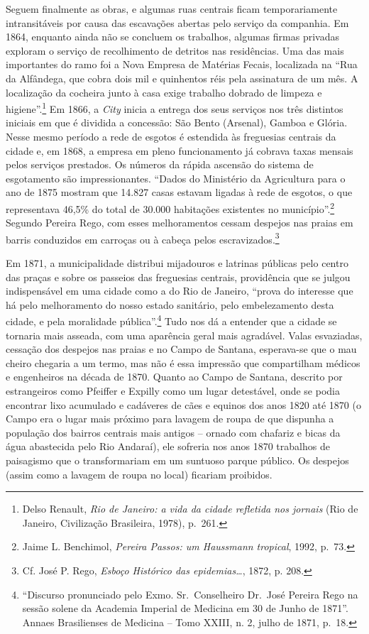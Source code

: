 Seguem finalmente as obras, e algumas ruas centrais ficam
temporariamente intransitáveis por causa das escavações abertas pelo
serviço da companhia. Em 1864, enquanto ainda não se concluem os
trabalhos, algumas firmas privadas exploram o serviço de recolhimento de
detritos nas residências. Uma das mais importantes do ramo foi a Nova
Empresa de Matérias Fecais, localizada na ``Rua da Alfândega, que cobra
dois mil e quinhentos réis pela assinatura de um mês. A localização da
cocheira junto à casa exige trabalho dobrado de limpeza e
higiene''.\footnote{Delso Renault, \emph{Rio de Janeiro: a vida da
  cidade refletida nos jornais} (Rio de Janeiro, Civilização Brasileira,
  1978), p.~261.} Em 1866, a \emph{City} inicia a entrega dos seus
serviços nos três distintos iniciais em que é dividida a concessão: São
Bento (Arsenal), Gamboa e Glória. Nesse mesmo período a rede de esgotos
é estendida às freguesias centrais da cidade e, em 1868, a empresa em
pleno funcionamento já cobrava taxas mensais pelos serviços prestados.
Os números da rápida ascensão do sistema de esgotamento são
impressionantes. ``Dados do Ministério da Agricultura para o ano de 1875
mostram que 14.827 casas estavam ligadas à rede de esgotos, o que
representava 46,5\% do total de 30.000 habitações existentes no
município''.\footnote{Jaime L. Benchimol, \emph{Pereira Passos: um
  Haussmann tropical}, 1992, p.~73.} Segundo Pereira Rego, com esses
melhoramentos cessam despejos nas praias em barris conduzidos em
carroças ou à cabeça pelos escravizados.\footnote{Cf. José P. Rego,
  \emph{Esboço Histórico das epidemias\ldots{}}, 1872, p. 208.}

Em 1871, a municipalidade distribui mijadouros e latrinas públicas pelo
centro das praças e sobre os passeios das freguesias centrais,
providência que se julgou indispensável em uma cidade como a do Rio de
Janeiro, ``prova do interesse que há pelo melhoramento do nosso estado
sanitário, pelo embelezamento desta cidade, e pela moralidade
pública''.\footnote{``Discurso pronunciado pelo Exmo. Sr.~Conselheiro
  Dr.~José Pereira Rego na sessão solene da Academia Imperial de
  Medicina em 30 de Junho de 1871''. Annaes Brasilienses de Medicina --
  Tomo XXIII, n. 2, julho de 1871, p.~18.} Tudo nos dá a entender que a
cidade se tornaria mais asseada, com uma aparência geral mais agradável.
Valas esvaziadas, cessação dos despejos nas praias e no Campo de
Santana, esperava-se que o mau cheiro chegaria a um termo, mas não é
essa impressão que compartilham médicos e engenheiros na década de 1870.
Quanto ao Campo de Santana, descrito por estrangeiros como Pfeiffer e
Expilly como um lugar detestável, onde se podia encontrar lixo acumulado
e cadáveres de cães e equinos dos anos 1820 até 1870 (o Campo era o
lugar mais próximo para lavagem de roupa de que dispunha a população dos
bairros centrais mais antigos -- ornado com chafariz e bicas da água
abastecida pelo Rio Andaraí), ele sofreria nos anos 1870 trabalhos de
paisagismo que o transformariam em um suntuoso parque público. Os
despejos (assim como a lavagem de roupa no local) ficariam proibidos.

